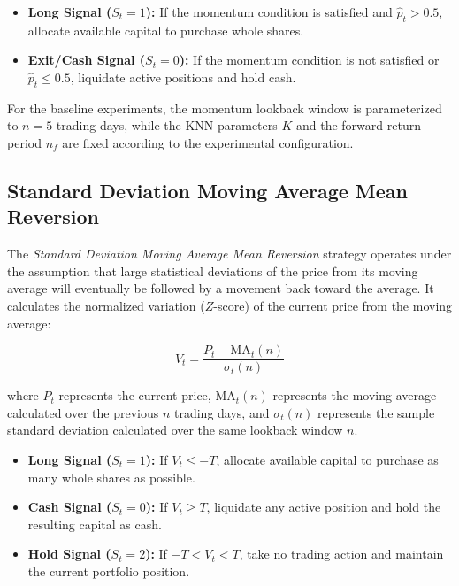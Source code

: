\documentclass{article}
\begin{document}
\begin{itemize}

\item \textbf{Long Signal ($S_t = 1$):} If the momentum condition is satisfied and $\hat{p}_t > 0.5$, allocate available capital to purchase whole shares.

\item \textbf{Exit/Cash Signal ($S_t = 0$):} If the momentum condition is not satisfied or $\hat{p}_t \le 0.5$, liquidate active positions and hold cash.

\end{itemize}

For the baseline experiments, the momentum lookback window is parameterized to $n=5$ trading days, while the KNN parameters $K$ and the forward-return period $n_f$ are fixed according to the experimental configuration.

\subsection{Standard Deviation Moving Average Mean Reversion}

The \textit{Standard Deviation Moving Average Mean Reversion} strategy operates under the assumption that large statistical deviations of the price from its moving average will eventually be followed by a movement back toward the average. It calculates the normalized variation ($Z$-score) of the current price from the moving average:

\[
V_t = \frac{P_t - \text{MA}_t(n)}{\sigma_t(n)}
\]

where $P_t$ represents the current price, $\text{MA}_t(n)$ represents the moving average calculated over the previous $n$ trading days, and $\sigma_t(n)$ represents the sample standard deviation calculated over the same lookback window $n$.

\begin{itemize}

    \item \textbf{Long Signal ($S_t = 1$):} If $V_t \le -T$, allocate available capital to purchase as many whole shares as possible.

    \item \textbf{Cash Signal ($S_t = 0$):} If $V_t \ge T$, liquidate any active position and hold the resulting capital as cash.

    \item \textbf{Hold Signal ($S_t = 2$):} If $-T < V_t < T$, take no trading action and maintain the current portfolio position.

\end{itemize}
\end{document}
